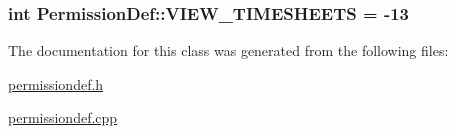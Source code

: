 \subsubsection[{V\+I\+E\+W\+\_\+\+T\+I\+M\+E\+S\+H\+E\+E\+T\+S}]{\setlength{\rightskip}{0pt plus 5cm}int Permission\+Def\+::\+V\+I\+E\+W\+\_\+\+T\+I\+M\+E\+S\+H\+E\+E\+T\+S = -\/13\hspace{0.3cm}{\ttfamily [static]}}\label{class_permission_def_a124416119c668b3afe569be8a4055e54}


The documentation for this class was generated from the following files\+:\begin{DoxyCompactItemize}
\item 
\hyperlink{permissiondef_8h}{permissiondef.\+h}\item 
\hyperlink{permissiondef_8cpp}{permissiondef.\+cpp}\end{DoxyCompactItemize}
